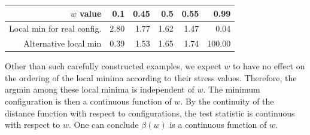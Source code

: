 \documentclass[11pt]{article} %
\begin{document}
\begin{table}[ht]
\begin{center}
\begin{tabular}{rrrrrr}
  \hline
 $w$ value & 0.1 & 0.45 & 0.5 & 0.55 & 0.99 \\ 
  \hline
Local min for real config. & 2.80 & 1.77 & 1.62 & 1.47 & 0.04 \\ 
  Alternative local min & 0.39 & 1.53 & 1.65 & 1.74 & 100.00 \\ 
   \hline
\end{tabular}
\end{center}
\end{table}

Other than such carefully constructed examples, we expect $w$ to have no effect on the ordering of the local minima according to their stress values.
Therefore,  the argmin among these local minima is independent of $w$. The minimum configuration is then a continuous function of $w$. 
By the continuity of the distance function with respect to configurations, the test statistic is continuous with respect to $w$. One can conclude $\beta(w) $ is a continuous function of $w$. 

 
\end{document}

